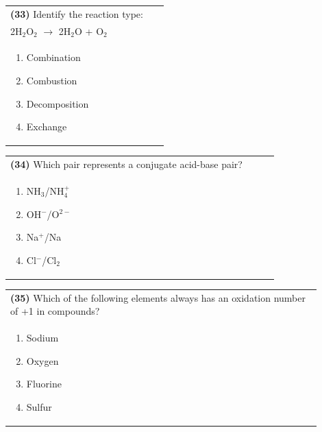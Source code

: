 \documentclass{article}
\begin{document}
\noindent\begin{tabular}{|p{0.9\linewidth}|}
\hline
\textbf{(33)} Identify the reaction type:\\[0.2cm]
2H$_2$O$_2$ $\rightarrow$ 2H$_2$O + O$_2$\\[0.2cm]
\begin{minipage}[t]{0.85\linewidth}
\begin{enumerate}[label=\alph*.]
\item Combination
\item Combustion
\item Decomposition
\item Exchange
\end{enumerate}
\end{minipage}\\[0.2cm]
\hline
\end{tabular}

\noindent\begin{tabular}{|p{0.9\linewidth}|}
\hline
\textbf{(34)} Which pair represents a conjugate acid-base pair?\\[0.2cm]
\begin{minipage}[t]{0.85\linewidth}
\begin{enumerate}[label=\alph*.]
\item NH$_3$/NH$_4^+$
\item OH$^-$/O$^{2-}$
\item Na$^+$/Na
\item Cl$^-$/Cl$_2$
\end{enumerate}
\end{minipage}\\[0.2cm]
\hline
\end{tabular}

\noindent\begin{tabular}{|p{0.9\linewidth}|}
\hline
\textbf{(35)} Which of the following elements always has an oxidation number of +1 in compounds?\\[0.2cm]
\begin{minipage}[t]{0.85\linewidth}
\begin{enumerate}[label=\alph*.]
\item Sodium
\item Oxygen
\item Fluorine
\item Sulfur
\end{enumerate}
\end{minipage}\\[0.2cm]
\hline
\end{tabular}
\end{document}
